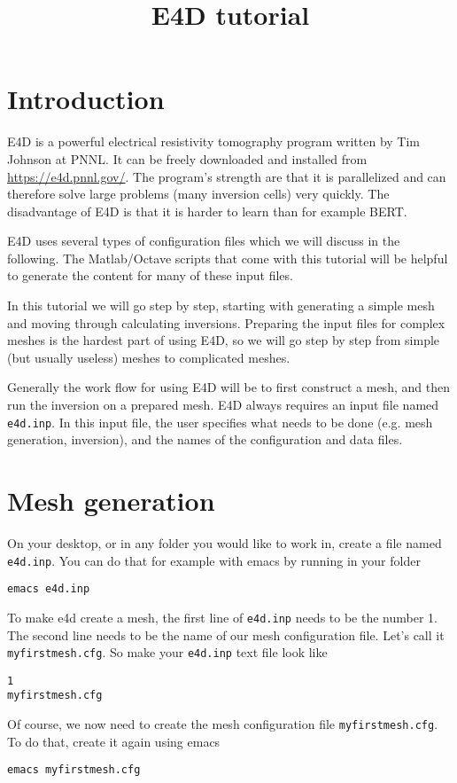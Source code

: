 \documentclass[11pt]{article}
\title{E4D tutorial}
\begin{document}
\section{Introduction}
E4D is a powerful electrical resistivity tomography program written by
Tim Johnson at PNNL. It can be freely downloaded and installed from
\url{https://e4d.pnnl.gov/}. The program's strength are that it is
parallelized and can therefore solve large problems (many inversion
cells) very quickly. The disadvantage of E4D is that it is harder to
learn than for example BERT.

E4D uses several types of configuration files which we will discuss in the
following. The Matlab/Octave scripts that come with this tutorial will
be helpful to generate the content for many of these input files.

In this tutorial we will go step by step, starting with generating a
simple mesh and moving through calculating inversions. Preparing the
input files for complex meshes is the hardest part of using E4D, so we
will go step by step from simple (but usually useless) meshes to
complicated meshes.

Generally the work flow for using E4D will be to first construct a
mesh, and then run the inversion on a prepared mesh. E4D always
requires an input file named \verb+e4d.inp+. In this input file, the
user specifies what needs to be done (e.g. mesh generation,
inversion), and the names of the configuration and data files.


\section{Mesh generation}
On your desktop, or in any folder you would like to work in, create a
file named \verb+e4d.inp+. You can do that for example with emacs by
running in your folder

\qquad \verb+emacs e4d.inp+ 


To make e4d create a mesh, the first line of \verb+e4d.inp+ needs to
be the number 1. The second line needs to be the name of our mesh
configuration file. Let's call it \verb+myfirstmesh.cfg+. So make your
\verb+e4d.inp+ text file look like

\verb+1+\\
\verb+myfirstmesh.cfg+

Of course, we now need to create the mesh configuration file
\verb+myfirstmesh.cfg+. To do that, create it again using emacs

\qquad \verb+emacs myfirstmesh.cfg+
\end{document}
